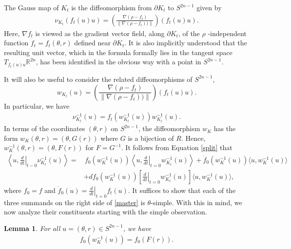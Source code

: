 \documentclass[12pt]{amsart}
\newtheorem{lemma}[theorem]{Lemma}
\theoremstyle{definition}
\newcommand{\RR}{{\mathbb R}}
\begin{document}
The Gauss map of $K_t$ is the diffeomorphism from $\partial K_t$ to $S^{2n-1}$  given by
\begin{align*}
    \nu_{K_t}(f_t(u)u) = \left(\frac{\nabla(\rho - f_t)}{\|\nabla(\rho - f_t))\|}\right) (f_t(u)u).
\end{align*}
Here, $\nabla f_t$ is viewed as the gradient vector field, along $\partial K_t$, of the $\rho$ -independent function $f_t= f_t(\theta,r)$ defined near $\partial K_t$. It is also implicitly understood that the resulting unit vector, which in the formula formally lies in the tangent space $T_{f_t(u)u}\RR^{2n}$, has been identified in the obvious way with a point in $S^{2n-1}.$  

It will also be useful to consider the related diffeomorphisms of $S^{2n-1}$, 
\begin{equation}\label{w}
    w_{K_t}(u) = \left(\frac{\nabla(\rho - f_t)}{\|\nabla(\rho - f_t))\|}\right) (f_t(u)u).
\end{equation}
In particular, we have
\begin{align}\label{split}
 \nu_{K_t}^{-1}(u) = f_t(w_{K_t}^{-1}(u))w_{K_t}^{-1}(u). 
\end{align}
In terms of the coordinates $(\theta,r)$ on $S^{2n-1}$, the diffeomorphism $w_K$ has the form $w_K(\theta,r)= (\theta, G(r))$ where $G$ is a bijection of $R$. Hence, $w^{-1}_K(\theta,r)= (\theta, F(r))$ for $F=G^{-1}$.
It follows from Equation \eqref{split} that 
\begin{align}\label{master}
  \left\langle u, \left.\frac{d}{dt}\right|_{t-0} \nu^{-1}_{K_t}(u)\right\rangle =& \,f_0(w_K^{-1}(u))\left\langle u, \left.\frac{d}{dt}\right|_{t=0} w^{-1}_{K_t}(u)\right\rangle  +\dot{f}_0(w_{K}^{-1}(u))\langle u, w_K^{-1}(u)\rangle\\ &\nonumber + df_0 (w_{K}^{-1}(u)) \left[  \left.\frac{d}{dt}\right|_{t=0} w^{-1}_{K_t}(u)\right] \langle u, w_K^{-1}(u)\rangle, 
\end{align}
where $f_0=f$ and $\dot{f}_0(u) = \left.\frac{d}{dt}\right|_{t=0} f_t(u)$. It suffices to show that each of the three summands on the right side of \eqref{master} is $\theta$-simple. With this in mind, we now analyze their constituents starting with the simple observation.
\begin{lemma}\label{f0}
For all $u =(\theta,r) \in S^{2n-1}$, we have 
\begin{align*}
 f_0(w_K^{-1}(u)) = f_0(F(r)).   
\end{align*}
\end{lemma}
\end{document}
